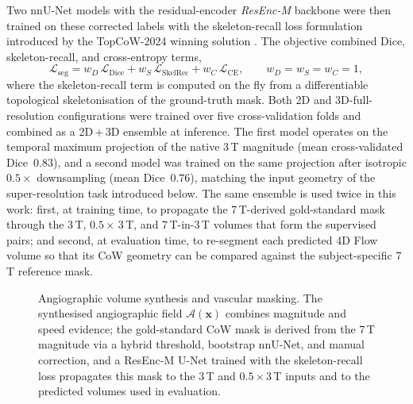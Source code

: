 Two nnU-Net models with the residual-encoder \emph{ResEnc-M} backbone
\cite{isensee2021nnunet} were then trained on these corrected labels
with the skeleton-recall loss formulation introduced by the
TopCoW-2024 winning solution \cite{yang2023topcow,aydin2024topcow}.
The objective combined Dice, skeleton-recall, and cross-entropy terms,
\begin{equation}
    \mathcal{L}_{\text{seg}}
    = w_{D}\,\mathcal{L}_{\text{Dice}}
    + w_{S}\,\mathcal{L}_{\text{SkelRec}}
    + w_{C}\,\mathcal{L}_{\text{CE}},
    \qquad w_{D}=w_{S}=w_{C}=1,
\end{equation}
where the skeleton-recall term is computed on the fly from a
differentiable topological skeletonisation of the ground-truth mask.
Both 2D and 3D-full-resolution configurations were trained over five
cross-validation folds and combined as a 2D\,$+$\,3D ensemble at
inference. The first model operates on the temporal maximum projection
of the native 3\,T magnitude (mean cross-validated Dice~$0.83$), and a
second model was trained on the same projection after isotropic
$0.5{\times}$ downsampling (mean Dice~$0.76$), matching the input
geometry of the super-resolution task introduced below. The same
ensemble is used twice in this work: first, at training time, to
propagate the 7\,T-derived gold-standard mask through the 3\,T,
$0.5{\times}$\,3\,T, and 7\,T-in-3\,T volumes that form the supervised
pairs; and second, at evaluation time, to re-segment each predicted
4D Flow volume so that its CoW geometry can be compared against the
subject-specific 7\,T reference mask.

\begin{figure}[!htbp]
    \centering
    \caption{Angiographic volume synthesis and vascular masking. The
    synthesised angiographic field $\mathcal{A}(\mathbf{x})$ combines
    magnitude and speed evidence; the gold-standard CoW mask is derived
    from the 7\,T magnitude via a hybrid threshold, bootstrap nnU-Net,
    and manual correction, and a ResEnc-M U-Net trained with the
    skeleton-recall loss propagates this mask to the 3\,T and
    $0.5{\times}3$\,T inputs and to the predicted volumes used in
    evaluation.}
    \label{fig:segmentation}
\end{figure}


